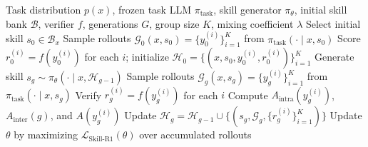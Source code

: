 


\begin{algorithm}[ht]
\caption{Skill-R1: Agent Skill Evolution via Reinforcement Learning}
\label{alg:skillr1}
\begin{algorithmic}[1]
\Require Task distribution $p(x)$, frozen task LLM $\pi_{\mathrm{task}}$, skill generator $\pi_\theta$, initial skill bank $\mathcal{B}$, verifier $f$, generations $G$, group size $K$, mixing coefficient $\lambda$
    \State Select initial skill $s_0 \in \mathcal{B}_x$
    \State Sample rollouts $\mathcal{G}_0(x, s_0) = \{y_0^{(i)}\}_{i=1}^K$ from $\pi_{\mathrm{task}}(\cdot \mid x, s_0)$
    \State Score $r_0^{(i)} = f(y_0^{(i)})$ for each $i$; initialize $\mathcal{H}_0 = \{(x, s_0, y_0^{(i)}, r_0^{(i)})\}_{i=1}^K$
        \State Generate skill $s_g \sim \pi_\theta(\cdot \mid x, \mathcal{H}_{g-1})$ 
        \State Sample rollouts $\mathcal{G}_g(x, s_g) = \{y_g^{(i)}\}_{i=1}^K$ from $\pi_{\mathrm{task}}(\cdot \mid x, s_g)$
        \State Verify $r_g^{(i)} = f(y_g^{(i)})$ for each $i$
        \State Compute $A_{\mathrm{intra}}(y_g^{(i)})$, $A_{\mathrm{inter}}(g)$, and $A(y_g^{(i)})$ 
        \State Update $\mathcal{H}_g = \mathcal{H}_{g-1} \cup \{(s_g, \mathcal{G}_g, \{r_g^{(i)}\}_{i=1}^K)\}$
    \EndFor
\EndFor
\State Update $\theta$ by maximizing $\mathcal{L}_{\mathrm{Skill\text{-}R1}}(\theta)$ over accumulated rollouts 
\end{algorithmic}
\end{algorithm}




